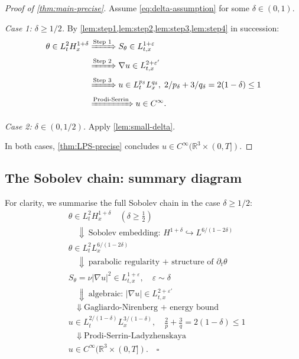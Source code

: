 \documentclass[12pt]{article}
\theoremstyle{plain}
\theoremstyle{definition}
\theoremstyle{remark}
\newcommand{\R}{\mathbb{R}}
\newcommand{\abs}[1]{\left|#1\right|}
\newcommand{\pa}{\partial}
\newcommand{\eps}{\varepsilon}
\newcommand{\grad}{\nabla}
\begin{document}
\begin{proof}[Proof of \cref{thm:main-precise}]
  Assume \eqref{eq:delta-assumption} for some $\delta\in(0,1)$.

  \textit{Case 1: $\delta\geq 1/2$.}
  By \cref{lem:step1,lem:step2,lem:step3,lem:step4} in succession:
  \begin{align*}
    \theta\in L^2_t H^{1+\delta}_x
    &\xRightarrow{\text{Step 1}}
    S_\theta\in L^{1+\eps}_{t,x}
    \\
    &\xRightarrow{\text{Step 2}}
    \grad u\in L^{2+\eps'}_{t,x}
    \\
    &\xRightarrow{\text{Step 3}}
    u\in L^{p_\delta}_t L^{q_\delta}_x,\; 2/p_\delta+3/q_\delta=2(1-\delta)\leq 1
    \\
    &\xRightarrow{\text{Prodi-Serrin}}
    u\in C^\infty.
  \end{align*}

  \textit{Case 2: $\delta\in(0,1/2)$.}
  Apply \cref{lem:small-delta}.

  In both cases, \cref{thm:LPS-precise} concludes $u\in C^\infty(\R^3\times(0,T])$.
\end{proof}

\subsection{The Sobolev chain: summary diagram}

For clarity, we summarise the full Sobolev chain in the case $\delta\geq 1/2$:
\begin{equation}\label{eq:sobolev-chain}
\boxed{
\begin{aligned}
  &\theta\in L^2_t H^{1+\delta}_x \quad (\delta\geq\tfrac{1}{2})\\
  &\quad\Downarrow\ \text{Sobolev embedding: }H^{1+\delta}\hookrightarrow L^{6/(1-2\delta)}\\
  &\theta\in L^2_t L^{6/(1-2\delta)}_x \\
  &\quad\Downarrow\ \text{parabolic regularity + structure of }\pa_t\theta\\
  &S_\theta=\nu\abs{\grad u}^2\in L^{1+\eps}_{t,x},\quad \eps\sim\delta\\
  &\quad\Downarrow\ \text{algebraic: }\abs{\grad u}\in L^{2+\eps'}_{t,x}\\
  &\quad\Downarrow\ \text{Gagliardo-Nirenberg + energy bound}\\
  &u\in L^{2/(1-\delta)}_t L^{3/(1-\delta)}_x,\quad
    \tfrac{2}{p}+\tfrac{3}{q}=2(1-\delta)\leq 1\\
  &\quad\Downarrow\ \text{Prodi-Serrin-Ladyzhenskaya}\\
  &u\in C^\infty(\R^3\times(0,T]).\quad \square
\end{aligned}
}
\end{equation}
\end{document}
